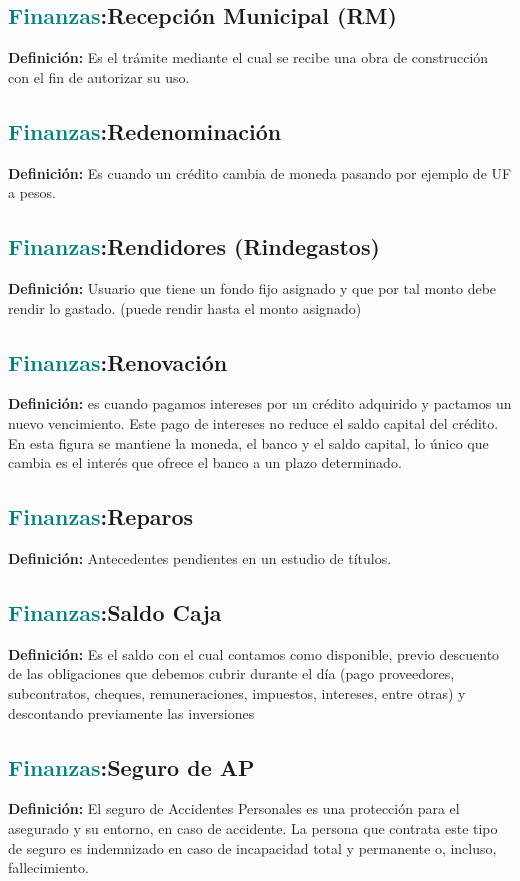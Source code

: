 \documentclass[12pt]{article}
\begin{document}
\subsection{\textcolor{teal}{Finanzas}:{Recepción Municipal (RM)}}
\textbf{Definición:} Es el trámite mediante el cual se recibe una obra de construcción con el fin de autorizar su uso.
\subsection{\textcolor{teal}{Finanzas}:{Redenominación}}
\textbf{Definición:} Es cuando un crédito cambia de moneda pasando por ejemplo de UF a pesos.
\subsection{\textcolor{teal}{Finanzas}:{Rendidores (Rindegastos)}}
\textbf{Definición:} Usuario que tiene un fondo fijo asignado y que por tal monto debe rendir lo gastado. (puede rendir hasta el monto asignado)
\subsection{\textcolor{teal}{Finanzas}:{Renovación}}
\textbf{Definición:} es cuando pagamos intereses por un crédito adquirido y pactamos un nuevo vencimiento. Este pago de intereses no reduce el saldo capital del crédito. En esta figura se mantiene la moneda, el banco y el saldo capital, lo único que cambia es el interés que ofrece el banco a un plazo determinado.
\subsection{\textcolor{teal}{Finanzas}:{Reparos}}
\textbf{Definición:} Antecedentes pendientes en un estudio de títulos.
\subsection{\textcolor{teal}{Finanzas}:{Saldo Caja}}
\textbf{Definición:} Es el saldo con el cual contamos como disponible, previo descuento de las obligaciones que debemos cubrir durante el día (pago proveedores, subcontratos, cheques, remuneraciones, impuestos, intereses, entre otras) y descontando previamente las inversiones
\subsection{\textcolor{teal}{Finanzas}:{Seguro de AP}}
\textbf{Definición:} El seguro de Accidentes Personales es una protección para el asegurado y su entorno, en caso de accidente. La persona que contrata este tipo de seguro es indemnizado en caso de incapacidad total y permanente o, incluso, fallecimiento.
\end{document}
